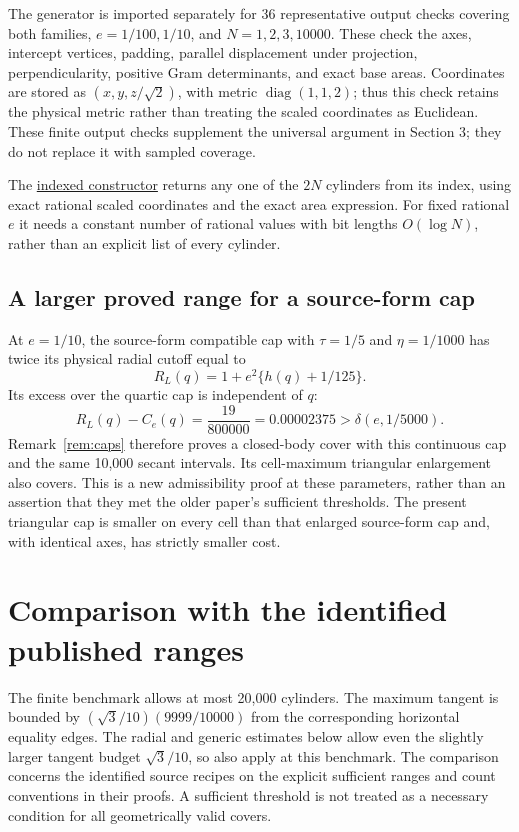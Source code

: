 \documentclass[11pt]{amsart}
\theoremstyle{definition}
\theoremstyle{remark}
\newcommand{\repo}[2]{\href{https://github.com/shjvandekamp/math/blob/main/topics/cylinder-covering/#1}{#2}}
\begin{document}
The generator is imported separately for 36 representative output checks
covering both families, $e=1/100,1/10$, and $N=1,2,3,10000$.
These check the axes, intercept vertices, padding, parallel displacement
under projection, perpendicularity, positive Gram determinants, and exact
base areas. Coordinates are stored as $(x,y,z/\sqrt2)$, with metric
$\operatorname{diag}(1,1,2)$; thus this check retains the physical metric
rather than treating the scaled coordinates as Euclidean. These finite
output checks supplement the universal argument in Section 3; they do not
replace it with sampled coverage.

The \repo{secant_construction.py}{indexed constructor} returns any one of
the $2N$ cylinders from its index, using exact rational scaled coordinates
and the exact area expression. For fixed rational $e$ it needs a constant
number of rational values with bit lengths $O(\log N)$, rather than an
explicit list of every cylinder.

\subsection{A larger proved range for a source-form cap}
At $e=1/10$, the source-form compatible cap with
$\tau=1/5$ and $\eta=1/1000$ has twice its physical radial cutoff equal
to
\[
 R_L(q)=1+e^2\{h(q)+1/125\}.
\]
Its excess over the quartic cap is independent of $q$:
\[
 R_L(q)-C_e(q)=\frac{19}{800000}=0.00002375>\delta(e,1/5000).
\]
Remark~\ref{rem:caps} therefore proves a closed-body cover with this
continuous cap and the same 10,000 secant intervals. Its cell-maximum
triangular enlargement also covers. This is a new admissibility proof at
these parameters, rather than an assertion that they met the older
paper's sufficient thresholds. The present triangular cap is smaller
on every cell than that enlarged source-form cap and, with identical
axes, has strictly smaller cost.

\section{Comparison with the identified published ranges}
\label{sec:comparison}

The finite benchmark allows at most 20,000 cylinders. The maximum tangent
is bounded by $(\sqrt3/10)(9999/10000)$ from the corresponding horizontal
equality edges. The radial and generic estimates below allow even the
slightly larger tangent budget $\sqrt3/10$, so also apply at this
benchmark. The comparison concerns the identified source recipes on the
explicit sufficient ranges and count conventions in their proofs. A
sufficient threshold is not treated as a necessary condition for all
geometrically valid covers.
\end{document}
